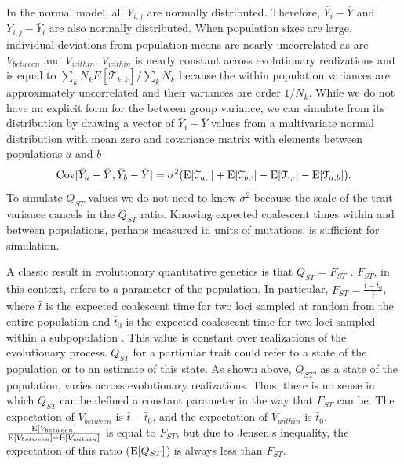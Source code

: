 In the normal model, all $Y_{i,j}$ are normally distributed. Therefore,
$\bar{Y}_{i} - \bar{Y}$ and $Y_{i,j} - \bar{Y}_i$ are also normally distributed.
When population sizes are large, individual deviations from population means are
nearly uncorrelated as are $V_{between}$ and $V_{within}$. $V_{within}$ is
nearly constant across evolutionary realizations and is equal to $\sum_k N_k
E[\mathcal{T}_{k,k}] / \sum_k N_k$ because the within population variances are
approximately uncorrelated and their variances are order $1/N_k$. While we do
not have an explicit form for the between group variance, we can simulate from
its distribution by drawing a vector of $\bar{Y}_{i} - \bar{Y}$ values from a
multivariate normal distribution with mean zero and covariance matrix with
elements between populations $a$ and $b$
\begin{equation}
  \mathrm{Cov}[\bar{Y}_{a} - \bar{Y}, \bar{Y}_{b} - \bar{Y}] =
  \sigma^2(\mathrm{E}[\mathcal{T}_{a,\cdot}] + \mathrm{E}[\mathcal{T}_{b,\cdot}] -
  \mathrm{E}[\mathcal{T}_{\cdot,\cdot}] - \mathrm{E}[\mathcal{T}_{a,b}]).
\end{equation}
To simulate $Q_{ST}$ values we do not need to know $\sigma^2$ because the scale
of the trait variance cancels in the $Q_{ST}$ ratio. Knowing expected coalescent
times within and between populations, perhaps measured in units of mutations, is
sufficient for simulation.

A classic result in evolutionary quantitative genetics is that $Q_{ST}=F_{ST}$
\citep{Whitlock1999}. $F_{ST}$, in this context, refers to a parameter of the
population. In particular, $F_{ST} = \frac{\bar{t} - \bar{t}_0}{\bar{t}}$, where
$\bar{t}$ is the expected coalescent time for two loci sampled at random from
the entire population and $\bar{t}_0$ is the expected coalescent time for two
loci sampled within a subpopulation \citep{Slatkin1991}. This value is constant
over realizations of the evolutionary process. $Q_{ST}$ for a particular trait
could refer to a state of the population or to an estimate of this state. As
shown above, $Q_{ST}$, as a state of the population, varies across evolutionary
realizations. Thus, there is no sense in which $Q_{ST}$ can be defined a
constant parameter in the way that $F_{ST}$ can be. The expectation of
$V_{between}$ is $\bar{t} - \bar{t}_0$, and the expectation of $V_{within}$ is
$\bar{t}_0$. $\frac{\mathrm{E}[V_{between}]}{\mathrm{E}[V_{between}] + \mathrm{E}[V_{within}]}$ is equal
to $F_{ST}$, but due to Jensen's inequality, the expectation of this ratio
($\mathrm{E}[Q_{ST}]$) is always less than $F_{ST}$.

